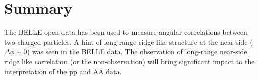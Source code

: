 \section{Summary}

The BELLE open data has been used to measure angular correlations between
two charged particles. A hint of long-range ridge-like structure at the
near-side ($\Delta\phi\sim 0$) was seen in the BELLE data. The observation of
long-range near-side ridge like correlation (or the non-observation) will
bring significant impact to the interpretation of the pp and AA data.
